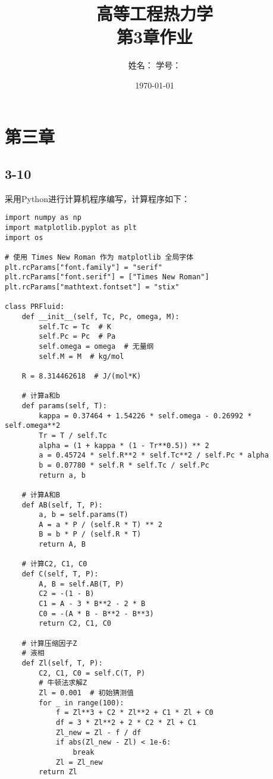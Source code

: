 \documentclass[12pt,a4paper]{article}
\title{高等工程热力学\\第3章作业}
\author{姓名：\underline{\hspace{4cm}} \quad 学号：\underline{\hspace{4cm}}}
\date{\today}
\begin{document}
\renewcommand{\maketitle}{}
\maketitle

\section*{第三章}

\subsection*{3-10}
采用Python进行计算机程序编写，计算程序如下：
\begin{lstlisting}
import numpy as np
import matplotlib.pyplot as plt
import os

# 使用 Times New Roman 作为 matplotlib 全局字体
plt.rcParams["font.family"] = "serif"
plt.rcParams["font.serif"] = ["Times New Roman"]
plt.rcParams["mathtext.fontset"] = "stix"

class PRFluid:
    def __init__(self, Tc, Pc, omega, M):
        self.Tc = Tc  # K
        self.Pc = Pc  # Pa
        self.omega = omega  # 无量纲
        self.M = M  # kg/mol

    R = 8.314462618  # J/(mol*K)

    # 计算a和b
    def params(self, T):
        kappa = 0.37464 + 1.54226 * self.omega - 0.26992 * self.omega**2
        Tr = T / self.Tc
        alpha = (1 + kappa * (1 - Tr**0.5)) ** 2
        a = 0.45724 * self.R**2 * self.Tc**2 / self.Pc * alpha
        b = 0.07780 * self.R * self.Tc / self.Pc
        return a, b

    # 计算A和B
    def AB(self, T, P):
        a, b = self.params(T)
        A = a * P / (self.R * T) ** 2
        B = b * P / (self.R * T)
        return A, B

    # 计算C2, C1, C0
    def C(self, T, P):
        A, B = self.AB(T, P)
        C2 = -(1 - B)
        C1 = A - 3 * B**2 - 2 * B
        C0 = -(A * B - B**2 - B**3)
        return C2, C1, C0

    # 计算压缩因子Z
    # 液相
    def Zl(self, T, P):
        C2, C1, C0 = self.C(T, P)
        # 牛顿法求解Z
        Zl = 0.001  # 初始猜测值
        for _ in range(100):
            f = Zl**3 + C2 * Zl**2 + C1 * Zl + C0
            df = 3 * Zl**2 + 2 * C2 * Zl + C1
            Zl_new = Zl - f / df
            if abs(Zl_new - Zl) < 1e-6:
                break
            Zl = Zl_new
        return Zl


\end{lstlisting}
\end{document}

